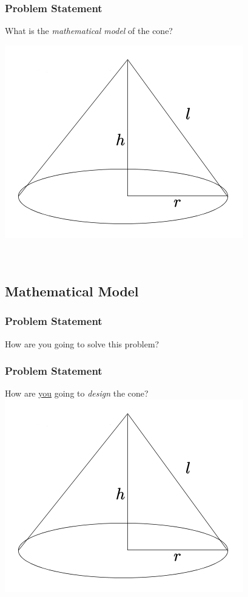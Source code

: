 \documentclass[fleqn]{beamer} %
\newcommand{\sectionIVsubsectionItitle}{Problem Statement}
\newcommand{\sectionIVsubsectionIItitle}{Mathematical Model}
\begin{document}
			\begin{frame}
				\frametitle{\sectionIVsubsectionItitle}
				\bigskip

				What is the {\it mathematical model} of the cone?  

				\includegraphics[scale=.35]{images/lecture3_fig1.png}\\
				 \\
				 \\

				\btVFill
			\end{frame}

		\subsection{\sectionIVsubsectionIItitle}\label{sectionIVsubsectionII}

			\begin{frame}
				\frametitle{\sectionIVsubsectionItitle}
				\bigskip

				How are you going to solve this problem?
				\vspace{50mm}	

				\btVFill
			\end{frame}

			\begin{frame}
				\frametitle{\sectionIVsubsectionItitle}
				\bigskip

				How are \underline{you} going to {\it design} the cone? \vspace{5mm}\\
				\includegraphics[scale=.35]{images/lecture3_fig1.png}\\

				\btVFill
			\end{frame}	
\end{document}
